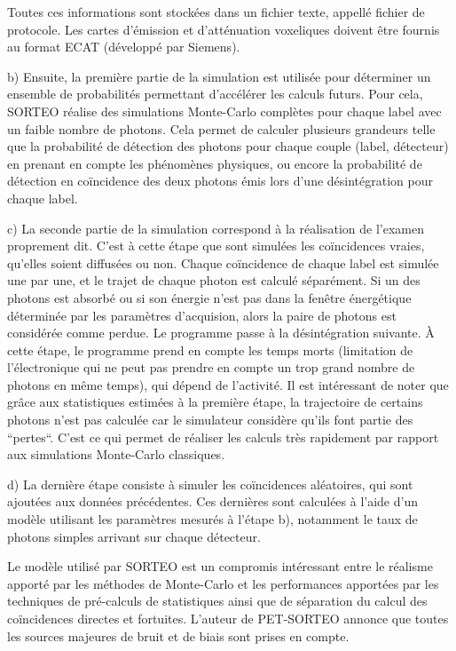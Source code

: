 Toutes ces informations sont stockées dans un fichier texte, appellé fichier de protocole. Les cartes d'émission et d'atténuation voxeliques doivent être fournis au format ECAT (développé par Siemens).

b) Ensuite, la première partie de la simulation est utilisée pour déterminer un ensemble de probabilités permettant d'accélérer les calculs futurs. Pour cela, SORTEO réalise des simulations Monte-Carlo complètes pour chaque label avec un faible nombre de photons. Cela permet de calculer plusieurs grandeurs telle que la probabilité de détection des photons pour chaque couple (label, détecteur) en prenant en compte les phénomènes physiques, ou encore la probabilité de détection en coïncidence des deux photons émis lors d'une désintégration pour chaque label.

c) La seconde partie de la simulation correspond à la réalisation de l'examen proprement dit. C'est à cette étape que sont simulées les coïncidences vraies, qu'elles soient diffusées ou non. Chaque coïncidence de chaque label est simulée une par une, et le trajet de chaque photon est calculé séparément. Si un des photons est absorbé ou si son énergie n'est pas dans la fenêtre énergétique déterminée par les paramètres d'acquision, alors la paire de photons est considérée comme perdue. Le programme passe à la désintégration suivante. \`A cette étape, le programme prend en compte les temps morts (limitation de l'électronique qui ne peut pas prendre en compte un trop grand nombre de photons en même temps), qui dépend de l'activité. Il est intéressant de noter que grâce aux statistiques estimées à la première étape, la trajectoire de certains photons n'est pas calculée car le simulateur considère qu'ils font partie des ``pertes``. C'est ce qui permet de réaliser les calculs très rapidement par rapport aux simulations Monte-Carlo classiques.

d) La dernière étape consiste à simuler les coïncidences aléatoires, qui sont ajoutées aux données précédentes. Ces dernières sont calculées à l'aide d'un modèle utilisant les paramètres mesurés à l'étape b), notamment le taux de photons simples arrivant sur chaque détecteur.


Le modèle utilisé par SORTEO est un compromis intéressant entre le réalisme apporté par les méthodes de Monte-Carlo et les performances apportées par les techniques de pré-calculs de statistiques ainsi que de séparation du calcul des coïncidences directes et fortuites. L'auteur de PET-SORTEO annonce que toutes les sources majeures de bruit et de biais sont prises en compte.


